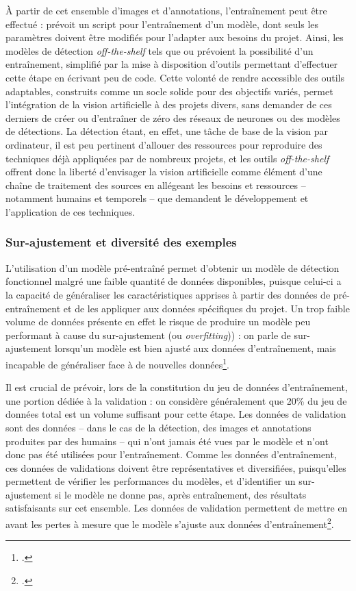 	À partir de cet ensemble d'images et d'annotations, l'entraînement peut être effectué : \yolov prévoit un script pour l'entraînement d'un modèle, dont seuls les paramètres doivent être modifiés pour l'adapter aux besoins du projet. Ainsi, les modèles de détection \textit{off-the-shelf} tels que \yolo ou \docex prévoient la possibilité d'un entraînement, simplifié par la mise à disposition d'outils permettant d'effectuer cette étape en écrivant peu de code. Cette volonté de rendre accessible des outils adaptables, construits comme un socle solide pour des objectifs variés, permet l'intégration de la vision artificielle à des projets divers, sans demander de ces derniers de créer ou d'entraîner de zéro des réseaux de neurones ou des modèles de détections. La détection étant, en effet, une tâche de base de la vision par ordinateur, il est peu pertinent d'allouer des ressources pour reproduire des techniques déjà appliquées par de nombreux projets, et les outils \textit{off-the-shelf} offrent donc la liberté d'envisager la vision artificielle comme élément d'une chaîne de traitement des sources en allégeant les besoins et ressources -- notamment humains et temporels -- que demandent le développement et l'application de ces techniques. 

    \subsubsection{Sur-ajustement et diversité des exemples}
	L'utilisation d'un modèle pré-entraîné permet d'obtenir un modèle de détection fonctionnel malgré une faible quantité de données disponibles, puisque celui-ci a la capacité de généraliser les caractéristiques apprises à partir des données de pré-entraînement et de les appliquer aux données spécifiques du projet. Un trop faible volume de données présente en effet le risque de produire un modèle peu performant à cause du sur-ajustement (ou \textit{overfitting})) : on parle de sur-ajustement lorsqu'un modèle est bien ajusté aux données d'entraînement, mais incapable de généraliser face à de nouvelles données\footcite{cholletApprentissageProfondAvec2020a}. 
	
	Il est crucial de prévoir, lors de la constitution du jeu de données d'entraînement, une portion dédiée à la validation : on considère généralement que 20\% du jeu de données total est un volume suffisant pour cette étape. Les données de validation sont des données -- dans le cas de la détection, des images et annotations produites par des humains -- qui n'ont jamais été vues par le modèle et n'ont donc pas été utilisées pour l'entraînement. Comme les données d'entraînement, ces données de validations doivent être représentatives et diversifiées, puisqu'elles permettent de vérifier les performances du modèles, et d'identifier un sur-ajustement si le modèle ne donne pas, après entraînement, des résultats satisfaisants sur cet ensemble. Les données de validation permettent de mettre en avant les pertes à mesure que le modèle s'ajuste aux données d'entraînement\footcite{carremansHandlingOverfittingDeep2019}.
	
